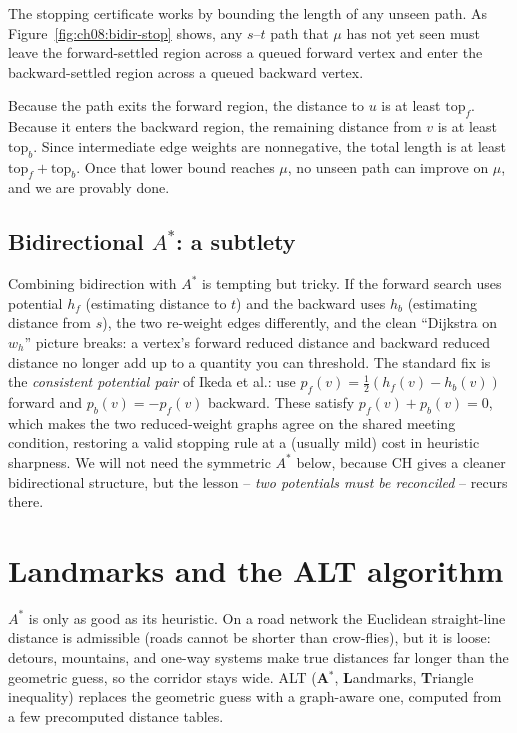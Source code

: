 \begin{whybox}
The stopping certificate works by bounding the length of any unseen path. As Figure~\ref{fig:ch08:bidir-stop} shows, any $s$--$t$ path that
$\mu$ has not yet seen must leave the forward-settled region across a
queued forward vertex and enter the backward-settled
region across a queued backward vertex.



Because the path exits the forward region, the distance to $u$ is at least $\mathrm{top}_f$. Because it enters the backward region, the remaining distance from $v$ is at least $\mathrm{top}_b$. Since intermediate edge weights are nonnegative, the total length is at least $\mathrm{top}_f+\mathrm{top}_b$. Once that lower bound reaches $\mu$, no unseen path can improve on $\mu$, and we are provably done.
\end{whybox}

\subsection{Bidirectional \texorpdfstring{$A^*$}{A*}: a subtlety}
\label{ch08:bidir-astar}

Combining bidirection with $A^*$ is tempting but tricky. If the forward search
uses potential $h_f$ (estimating distance to $t$) and the backward uses $h_b$
(estimating distance from $s$), the two re-weight edges differently, and the
clean ``Dijkstra on $w_h$'' picture breaks: a vertex's forward reduced distance
and backward reduced distance no longer add up to a quantity you can threshold.
The standard fix is the \emph{consistent potential pair} of Ikeda et al.: use
$p_f(v)=\tfrac12(h_f(v)-h_b(v))$ forward and $p_b(v)=-p_f(v)$ backward. These
satisfy $p_f(v)+p_b(v)=0$, which makes the two reduced-weight graphs agree on the
shared meeting condition, restoring a valid stopping rule at a (usually mild)
cost in heuristic sharpness. We will not need the symmetric $A^*$ below, because
CH gives a cleaner bidirectional structure, but the lesson -- \emph{two
potentials must be reconciled} -- recurs there.

\section{Landmarks and the ALT algorithm}
\label{ch08:alt}

$A^*$ is only as good as its heuristic. On a road network the Euclidean
straight-line distance is admissible (roads cannot be shorter than crow-flies),
but it is loose: detours, mountains, and one-way systems make true distances far
longer than the geometric guess, so the corridor stays wide. ALT
(\textbf{A}$^*$, \textbf{L}andmarks, \textbf{T}riangle inequality) replaces the
geometric guess with a graph-aware one, computed from a few precomputed distance
tables.

